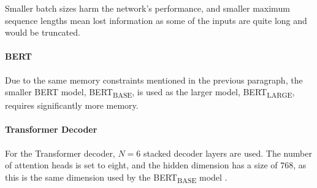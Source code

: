 Smaller batch sizes harm the network's performance, and smaller maximum sequence lengths mean lost information as some of the inputs are quite long and would be truncated.

\paragraph{BERT}

Due to the same memory constraints mentioned in the previous paragraph, the smaller BERT model, BERT\textsubscript{BASE}, is used as the larger model, BERT\textsubscript{LARGE}, requires significantly more memory.

\paragraph{Transformer Decoder}

For the Transformer decoder, $N=6$ stacked decoder layers are used.
The number of attention heads is set to eight, and the hidden dimension has a size of $768$, as this is the same dimension used by the BERT\textsubscript{BASE} model \cite[p.~3]{devlin2018bert}.


